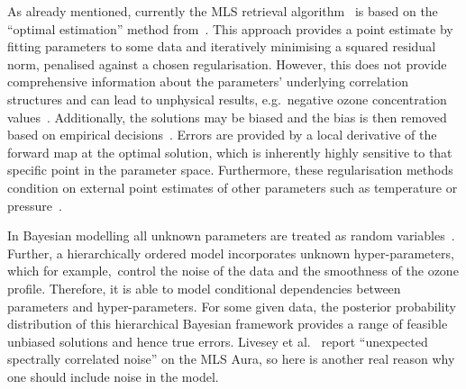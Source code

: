 As already mentioned, currently the MLS retrieval algorithm~\cite{livesey2006retrieval} is based on the ``optimal estimation'' method from~\cite{rodgers1976retrieval}.
This approach provides a point estimate by fitting parameters to some data and iteratively minimising a squared residual norm, penalised against a chosen regularisation.
However, this does not provide comprehensive information about the parameters' underlying correlation structures and can lead to unphysical results, e.g.~negative ozone concentration values~\cite{MLSdata}.
Additionally, the solutions may be biased and the bias is then removed based on empirical decisions~\cite{livesey2008ozonecarbonmono, Froidevaux2008snrozone}.
Errors are provided by a local derivative of the forward map at the optimal solution, which is inherently highly sensitive to that specific point in the parameter space.
Furthermore, these regularisation methods condition on external point estimates of other parameters such as temperature or pressure~\cite{livesey2006retrieval}.

In Bayesian modelling all unknown parameters are treated as random variables~\cite{kaipio2005statinv}.
Further, a hierarchically ordered model incorporates unknown hyper-parameters, which for example,~control the noise of the data and the smoothness of the ozone profile.
Therefore, it is able to model conditional dependencies between parameters and hyper-parameters.
For some given data, the posterior probability distribution of this hierarchical Bayesian framework provides a range of feasible unbiased solutions and hence true errors.
Livesey et al.~\cite{livesey2006retrieval} report ``unexpected spectrally correlated noise'' on the MLS Aura, so here is another real reason why one should include noise in the model.

